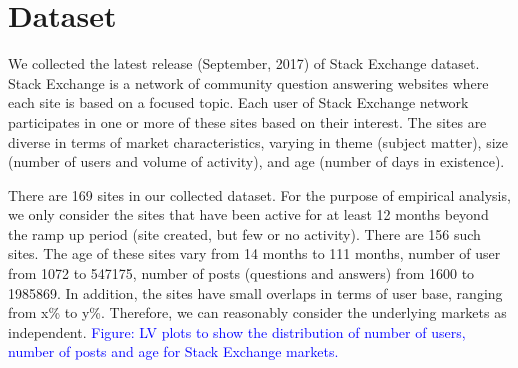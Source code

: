 \section{Dataset} 
We collected the latest release (September, 2017) of Stack Exchange dataset. Stack Exchange is a network of community question answering websites where each site is based on a focused topic. Each user of Stack Exchange network participates in one or more of these sites based on their interest. The sites are diverse in terms of market characteristics, varying in theme (subject matter), size (number of users and volume of activity), and age (number of days in existence). 

There are 169 sites in our collected dataset. For the purpose of empirical analysis, we only consider the sites that have been active for at least 12 months beyond the ramp up period (site created, but few or no activity). There are 156 such sites. The age of these sites vary from 14 months to 111 months, number of user from 1072 to 547175, number of posts (questions and answers) from 1600 to 1985869. In addition, the sites have small overlaps in terms of user base, ranging from x\% to y\%. Therefore, we can reasonably consider the underlying markets as independent. \textcolor{blue}{Figure: LV plots to show the distribution of number of users, number of posts and age for Stack Exchange markets.}

